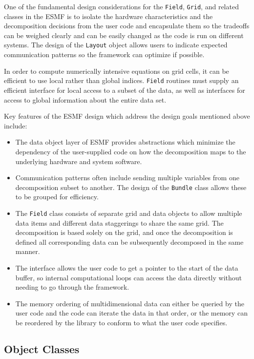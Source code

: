 One of the fundamental design considerations for the {\tt Field},
{\tt Grid}, and related classes in the ESMF is to isolate 
the hardware characteristics and the decomposition decisions from the
user code and encapsulate them so the tradeoffs can be 
weighed clearly and can be easily changed as the code is 
run on different systems.  The design of the {\tt Layout} object
allows users to indicate expected communication patterns so 
the framework can optimize if possible.

In order to compute numerically intensive equations on grid
cells, it can be efficient to use local rather 
than global indices.  {\tt Field} routines
must supply an efficient interface for local access to a
subset of the data, as well as interfaces for access to
global information about the entire data set.

Key features of the ESMF design which address the design goals
mentioned above include:
\begin{itemize}
\item The data object layer of ESMF provides abstractions which
minimize the dependency of the user-supplied code on 
how the decomposition maps to the underlying hardware
and system software.
\item Communication patterns often include sending multiple
variables from one decomposition subset to another.  
The design of the {\tt Bundle} class
allows these to be grouped for efficiency.
\item The {\tt Field} class consists of separate grid and data 
objects to allow multiple data items and different data staggerings
to share the same grid.  The decomposition is based solely on
the grid, and once the decomposition is defined all corresponding
data can be subsequently decomposed in the same manner.
\item The interface allows the user code to get a pointer to the
start of the data buffer, so internal computational loops can access
the data directly without needing to go through the framework.
\item The memory ordering of multidimensional data can either be
queried by the user code and the code can iterate the data in that
order, or the memory can be reordered by the library to conform to what
the user code specifies.  

\end{itemize}

\subsection{Object Classes}

